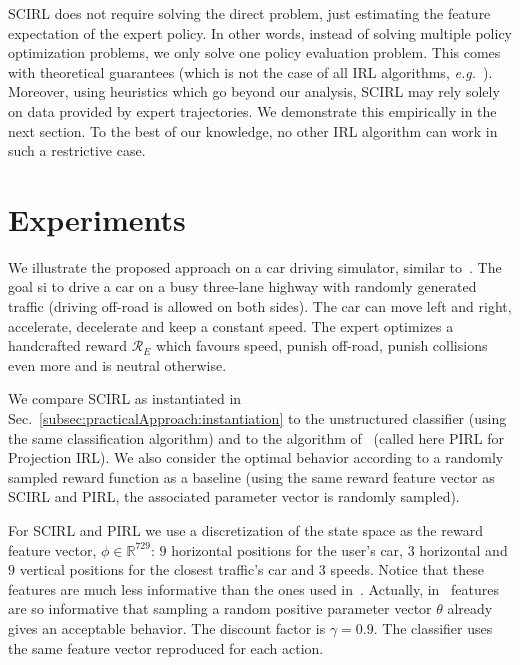\documentclass[english,utf8]{./hermes-journal}
\newcommand{\R}{\mathcal{R}}
\begin{document}
SCIRL does not require solving the direct problem, just estimating
the feature expectation of the expert policy. In other words,
instead of solving multiple policy optimization problems, we only
solve one policy evaluation problem. This comes with theoretical
guarantees (which is not the case of all IRL algorithms,
\textit{e.g.}~\cite{boularias:2011}). Moreover, using heuristics
which go beyond our analysis, SCIRL may rely solely on data provided
by expert trajectories. We demonstrate this empirically in the next
section. To the best of our knowledge, no other IRL algorithm can
work in such a restrictive case.


\section{Experiments}
\label{sec:experiments}

We illustrate the proposed approach on a car driving simulator,
similar to~\cite{Abbeel:2004,Syed:2008:game}. The goal si to drive a
car on a busy three-lane highway with randomly generated traffic
(driving off-road is allowed on both sides). The car can move left
and right, accelerate, decelerate and keep a constant speed. The
expert optimizes a handcrafted reward $\R_E$ which favours speed,
punish off-road, punish collisions even more  and is neutral
otherwise.

We compare SCIRL as instantiated in
Sec.~\ref{subsec:practicalApproach:instantiation} to the
unstructured classifier (using the same classification algorithm)
and to the algorithm of~\cite{Abbeel:2004} (called here PIRL for
Projection IRL). We also consider the optimal behavior according to
a randomly sampled reward function as a baseline (using the same
reward feature vector as SCIRL and PIRL, the associated parameter
vector is randomly sampled).

For SCIRL and PIRL we use a discretization of the state space as the
reward feature vector, $\phi\in\mathbb{R}^{729}$: $9$ horizontal
positions for the user's car, $3$ horizontal and $9$ vertical
positions for the closest traffic's car and $3$ speeds. Notice that
these features are much less informative than the ones used
in~\cite{Abbeel:2004,Syed:2008:game}. Actually,
in~\cite{Syed:2008:game} features are so informative that sampling a
random positive parameter vector $\theta$ already gives an
acceptable behavior. The discount factor is $\gamma = 0.9$. The
classifier uses the same feature vector reproduced for each action.
\end{document}
